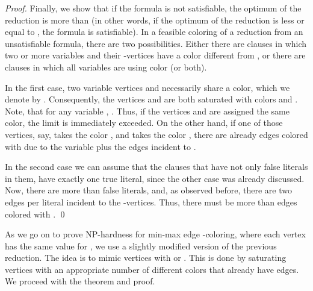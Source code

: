 \documentclass[runningheads, a4paper]{llncs}
\begin{document}
\begin{proof}
Finally, we show that if the formula is not satisfiable, the optimum of the reduction is more than  (in other words, if the optimum of the reduction is less or equal to , the formula is satisfiable). In a feasible coloring of a reduction from an unsatisfiable formula, there are two possibilities. Either there are clauses in which two or more variables and their -vertices have a color different from , or there are clauses in which all variables are using color  (or both).

In the first case, two variable vertices  and  necessarily share a color, which we denote by . Consequently, the vertices  and  are both saturated with colors  and . Note, that for any variable , . Thus, if the vertices  and  are assigned the same color, the limit  is immediately exceeded. On the other hand, if one of those vertices, say,  takes the color , and  takes the color , there are already  edges colored with  due to the variable  plus the edges incident to .

In the second case we can assume that the clauses that have not only false literals in them, have exactly one true literal, since the other case was already discussed. Now, there are more than  false literals, and, as observed before, there are two edges per literal incident to the -vertices. Thus, there must be more than  edges colored with . \qed
\end{proof}

As we go on to prove NP-hardness for min-max edge -coloring, where each vertex has the same value for , we use a slightly modified version of the previous reduction. The idea is to mimic vertices with  or . This is done by saturating vertices with an appropriate number of different colors that already have  edges. We proceed with the theorem and proof.
\end{document}
